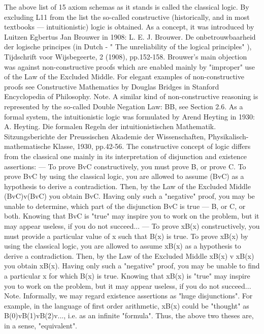 The above list of 15 axiom schemas as it stands is called the classical logic.
By excluding L11 from the list the so-called constructive (historically, and in most textbooks ---
intuitionistic) logic is obtained. As a concept, it was introduced by Luitzen Egbertus Jan Brouwer in
1908:
L. E. J. Brouwer. De onbetrouwbaarheid der logische principes (in Dutch - " The unreliability of the logical principles" ),
Tijdschrift voor Wijsbegeerte, 2 (1908), pp.152-158.
Brouwer's main objection was against non-constructive proofs which are enabled mainly by "improper"
use of the Law of the Excluded Middle.
For elegant examples of non-constructive proofs see Constructive Mathematics by Douglas Bridges in
Stanford Encyclopedia of Philosophy.
Note. A similar kind of non-constructive reasoning is represented by the so-called Double Negation Law:
\neg \neg B\IMPLIES B, see Section 2.6.
As a formal system, the intuitionistic logic was formulated by Arend Heyting in 1930:
A. Heyting. Die formalen Regeln der intuitionistischen Mathematik. Sitzungsberichte der Preussischen Akademie der
Wissenschaften, Physikalisch-mathematische Klasse, 1930, pp.42-56.
The constructive concept of logic differs from the classical one mainly in its interpretation of disjunction
and existence assertions:
--- To prove BvC constructively, you must prove B, or prove C. To prove BvC by using the classical logic,
you are allowed to assume \neg (BvC) as a hypothesis to derive a contradiction. Then, by the Law of the
Excluded Middle (BvC)v\neg (BvC) you obtain BvC. Having only such a "negative" proof, you may be
unable to determine, which part of the disjunction BvC is true --- B, or C, or both. Knowing that BvC is
"true" may inspire you to work on the problem, but it may appear useless, if you do not succeed...
--- To prove \exists xB(x) constructively, you must provide a particular value of x such that B(x) is true. To
prove \exists xB(x) by using the classical logic, you are allowed to assume \forall x\neg B(x) as a hypothesis to derive a
contradiction. Then, by the Law of the Excluded Middle \exists xB(x) v \neg \exists xB(x) you obtain \exists xB(x). Having
only such a "negative" proof, you may be unable to find a particular x for which B(x) is true. Knowing
that \exists xB(x) is "true" may inspire you to work on the problem, but it may appear useless, if you do not
succeed...
Note. Informally, we may regard existence assertions as "huge disjunctions". For example, in the
language of first order arithmetic, \exists xB(x) could be "thought" as B(0)vB(1)vB(2)v..., i.e. as an infinite
"formula". Thus, the above two theses are, in a sense, "equivalent".
